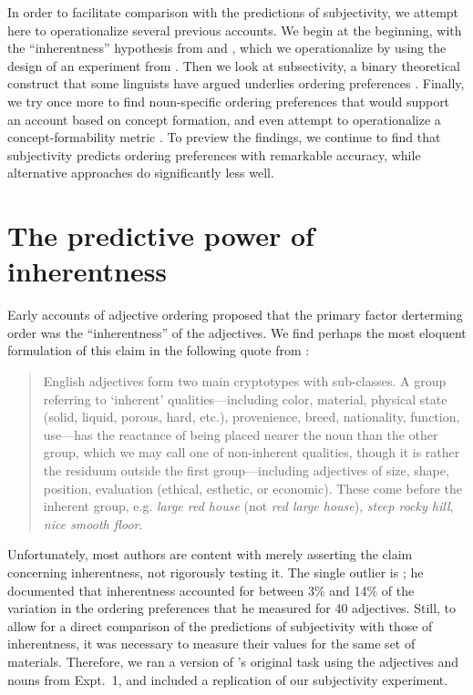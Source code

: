 \documentclass[12pt]{article}
\newcommand{\jd}[1]{\textcolor{red}{[jd: #1]}}
\begin{document}
In order to facilitate comparison with the predictions of subjectivity, we attempt here to operationalize several previous accounts. We begin at the beginning, with the ``inherentness'' hypothesis from \citet{sweet1898} and \citet{whorf1945}, which we operationalize by using the design of an experiment from \citet{martin1969}. Then we look at subsectivity, a binary theoretical construct that some linguists have argued underlies ordering preferences \citep[e.g.,][]{truswell2009}. Finally, we try once more to find noun-specific ordering preferences that would support an account based on concept formation, and even attempt to operationalize a concept-formability metric \citep{McNally2004,bouchard2005,svenonius2008}. To preview the findings, we continue to find that subjectivity predicts ordering preferences with remarkable accuracy, while alternative approaches do significantly less well.

\section{The predictive power of inherentness}

Early accounts of adjective ordering proposed that the primary factor derterming order was the ``inherentness'' of the adjectives. We find perhaps the most eloquent formulation of this claim in the following quote from \cite[p.~5]{whorf1945}: 

\begin{quotation}
English adjectives form two main cryptotypes with sub-classes. A group referring to `inherent' qualities---including color, material, physical state (solid, liquid, porous, hard, etc.), provenience, breed, nationality, function, use---has the reactance of being placed nearer the noun than the other group, which we may call one of non-inherent qualities, though it is rather the residuum outside the first group---including adjectives of size, shape, position, evaluation (ethical, esthetic, or economic). These come before the inherent group, e.g. \emph{large red house} (not \emph{red large house}), \emph{steep rocky hill}, \emph{nice smooth floor}.
\end{quotation}

Unfortunately, most authors are content with merely asserting the claim concerning inherentness, not rigorously testing it. The single outlier is \cite{martin1969}; he documented that inherentness accounted for between 3\% and 14\% of the variation in the ordering preferences that he measured for 40 adjectives.  Still, to allow for a direct comparison of the predictions of subjectivity with those of inherentness, it was necessary to measure their values for the same set of materials. Therefore, we ran a version of \citeauthor{martin1969}'s original task using the adjectives and nouns from Expt.~1, and included a replication of our subjectivity experiment.%
\end{document}
